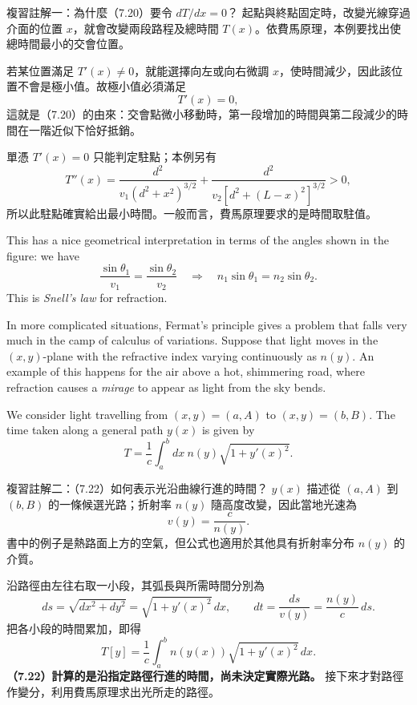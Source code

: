 \documentclass[11pt,a4paper,twoside]{article}
\newcommand{\pnum}[1]{\makebox[0pt][r]{\scriptsize\textbf{[#1]}\hspace{0.7em}}}
\newcommand{\StudyNote}[2]{\begin{studyNote}{#1}#2\end{studyNote}}
\begin{document}
\StudyNote{複習註解一：為什麼（7.20）要令 $dT/dx=0$？}{
起點與終點固定時，改變光線穿過介面的位置 $x$，就會改變兩段路程及總時間 $T(x)$。依費馬原理，本例要找出使總時間最小的交會位置。

若某位置滿足 $T'(x)\neq0$，就能選擇向左或向右微調 $x$，使時間減少，因此該位置不會是極小值。故極小值必須滿足
\[
    T'(x)=0,
\]
這就是（7.20）的由來：交會點微小移動時，第一段增加的時間與第二段減少的時間在一階近似下恰好抵銷。

單憑 $T'(x)=0$ 只能判定駐點；本例另有
\[
    T''(x)=
    \frac{d^2}{v_1(d^2+x^2)^{3/2}}
    +\frac{d^2}{v_2[d^2+(L-x)^2]^{3/2}}>0,
\]
所以此駐點確實給出最小時間。一般而言，費馬原理要求的是時間取駐值。
}

\noindent\pnum{32}This has a nice geometrical interpretation in terms of the angles shown in the figure: we have
\begin{equation}
    \frac{\sin\theta_1}{v_1}=\frac{\sin\theta_2}{v_2}
    \quad\Longrightarrow\quad n_1\sin\theta_1=n_2\sin\theta_2.
    \tag{7.21}
\end{equation}
\noindent\pnum{33}This is \textit{Snell's law} for refraction.

\noindent\pnum{34}In more complicated situations, Fermat's principle gives a problem that falls very much in the camp of calculus of variations. Suppose that light moves in the $(x,y)$-plane with the refractive index varying continuously as $n(y)$. An example of this happens for the air above a hot, shimmering road, where refraction causes a \textit{mirage} to appear as light from the sky bends.

\noindent\pnum{35}We consider light travelling from $(x,y)=(a,A)$ to $(x,y)=(b,B)$. The time taken along a general path $y(x)$ is given by
\begin{equation}
    T=\frac{1}{c}\int_a^b dx\ n(y)\sqrt{1+y'(x)^2}.
    \tag{7.22}
\end{equation}

\StudyNote{複習註解二：（7.22）如何表示光沿曲線行進的時間？}{
    $y(x)$ 描述從 $(a,A)$ 到 $(b,B)$ 的一條候選光路；折射率 $n(y)$ 隨高度改變，因此當地光速為
    \[
        v(y)=\frac{c}{n(y)}.
    \]
    書中的例子是熱路面上方的空氣，但公式也適用於其他具有折射率分布 $n(y)$ 的介質。

    沿路徑由左往右取一小段，其弧長與所需時間分別為
    \[
        ds=\sqrt{dx^2+dy^2}=\sqrt{1+y'(x)^2}\,dx,
        \qquad
        dt=\frac{ds}{v(y)}=\frac{n(y)}{c}\,ds.
    \]
    把各小段的時間累加，即得
    \[
        T[y]=\frac1c\int_a^b n(y(x))\sqrt{1+y'(x)^2}\,dx.
    \]
    \textbf{（7.22）計算的是沿指定路徑行進的時間，尚未決定實際光路。}
    接下來才對路徑作變分，利用費馬原理求出光所走的路徑。
}
\end{document}
